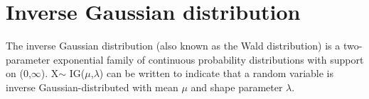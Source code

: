 \section*{Inverse Gaussian distribution}
The inverse Gaussian distribution (also known as the Wald distribution) is a two-parameter exponential family of continuous probability distributions with support on (0,$\infty$). X$\sim$ IG($\mu$,$\lambda$) can be written to indicate that a random variable is inverse Gaussian-distributed with mean $\mu$ and shape parameter $\lambda$. 

